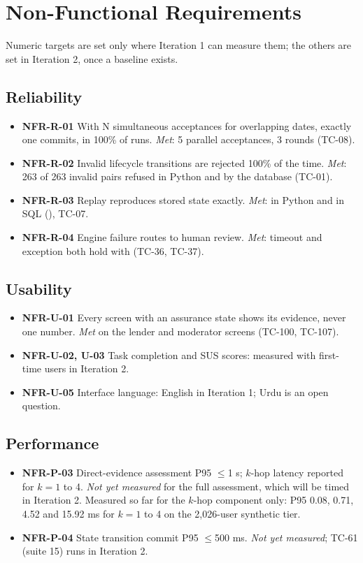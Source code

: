 \section{Non-Functional Requirements}\label{sec:non-functional-requirements}
Numeric targets are set only where Iteration 1 can measure them; the others are set in Iteration 2, once a baseline exists.

\subsection{Reliability}\label{sec:reliability}
\begin{itemize}
\item \textbf{NFR-R-01} With N simultaneous acceptances for overlapping dates, exactly one commits, in 100\% of runs. \textit{Met}: 5 parallel acceptances, 3 rounds (TC-08).
\item \textbf{NFR-R-02} Invalid lifecycle transitions are rejected 100\% of the time. \textit{Met}: 263 of 263 invalid pairs refused in Python and by the database (TC-01).
\item \textbf{NFR-R-03} Replay reproduces stored state exactly. \textit{Met}: in Python and in SQL (), TC-07.
\item \textbf{NFR-R-04} Engine failure routes to human review. \textit{Met}: timeout and exception both hold with  (TC-36, TC-37).
\end{itemize}

\subsection{Usability}\label{sec:usability}
\begin{itemize}
\item \textbf{NFR-U-01} Every screen with an assurance state shows its evidence, never one number. \textit{Met} on the lender and moderator screens (TC-100, TC-107).
\item \textbf{NFR-U-02, U-03} Task completion and SUS scores: measured with first-time users in Iteration 2.
\item \textbf{NFR-U-05} Interface language: English in Iteration 1; Urdu is an open question.
\end{itemize}

\subsection{Performance}\label{sec:performance}
\begin{itemize}
\item \textbf{NFR-P-03} Direct-evidence assessment P95 $\leq$1 s; $k$-hop latency reported for $k=1$ to 4. \textit{Not yet measured} for the full assessment, which will be timed in Iteration 2. Measured so far for the $k$-hop component only: P95 0.08, 0.71, 4.52 and 15.92 ms for $k=1$ to 4 on the 2,026-user synthetic tier.
\item \textbf{NFR-P-04} State transition commit P95 $\leq$500 ms. \textit{Not yet measured}; TC-61 (suite 15) runs in Iteration 2.
\end{itemize}

